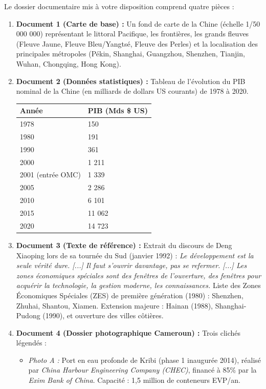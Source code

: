 \documentclass[11pt]{article}
\begin{document}
Le dossier documentaire mis à votre disposition comprend quatre pièces :
\begin{enumerate}
    \item \textbf{Document 1 (Carte de base) :} Un fond de carte de la Chine (échelle 1/50 000 000) représentant le littoral Pacifique, les frontières, les grands fleuves (Fleuve Jaune, Fleuve Bleu/Yangtsé, Fleuve des Perles) et la localisation des principales métropoles (Pékin, Shanghai, Guangzhou, Shenzhen, Tianjin, Wuhan, Chongqing, Hong Kong).
    \item \textbf{Document 2 (Données statistiques) :} Tableau de l'évolution du PIB nominal de la Chine (en milliards de dollars US courants) de 1978 à 2020.
    \begin{center}
    \begin{tabularx}{\linewidth}{|l|X|}\hline
    \textbf{Année} & \textbf{PIB (Mds \$ US)} \\ \hline
    1978 & 150 \\ \hline
    1980 & 191 \\ \hline
    1990 & 361 \\ \hline
    2000 & 1 211 \\ \hline
    2001 (entrée OMC) & 1 339 \\ \hline
    2005 & 2 286 \\ \hline
    2010 & 6 101 \\ \hline
    2015 & 11 062 \\ \hline
    2020 & 14 723 \\ \hline
    \end{tabularx}
    \end{center}
    \item \textbf{Document 3 (Texte de référence) :} Extrait du discours de Deng Xiaoping lors de sa tournée du Sud (janvier 1992) : \og \emph{Le développement est la seule vérité dure. [...] Il faut s'ouvrir davantage, pas se refermer. [...] Les zones économiques spéciales sont des fenêtres de l'ouverture, des fenêtres pour acquérir la technologie, la gestion moderne, les connaissances.} \fg{} Liste des Zones Économiques Spéciales (ZES) de première génération (1980) : Shenzhen, Zhuhai, Shantou, Xiamen. Extension majeure : Hainan (1988), Shanghai-Pudong (1990), et ouverture des villes côtières.
    \item \textbf{Document 4 (Dossier photographique Cameroun) :} Trois clichés légendés :
    \begin{itemize}
        \item \textit{Photo A :} Port en eau profonde de Kribi (phase 1 inaugurée 2014), réalisé par \emph{China Harbour Engineering Company (CHEC)}, financé à 85\% par la \emph{Exim Bank of China}. Capacité : 1,5 million de conteneurs EVP/an.

\end{itemize}
\end{enumerate}
\end{document}
